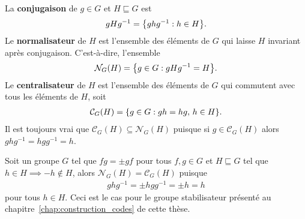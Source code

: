 La \textbf{conjugaison} de $g \in G$ et $H \sqsubseteq G$ est 
\begin{align}
  gHg^{-1} = \qty{ghg^{-1} : h \in H}.
\end{align}
Le \textbf{normalisateur} de $H$ est l'ensemble des éléments de $G$ qui laisse $H$
invariant après conjugaison.
C'est-à-dire, l'ensemble
\begin{align}
  \mathcal{N}_G(H) = \qty{g \in G : gHg^{-1} = H}.
\end{align}
Le \textbf{centralisateur} de $H$ est l'ensemble des éléments de $G$ qui commutent avec
tous les éléments de $H$, soit
\begin{align}
  \mathcal{C}_G(H) = \qty{g \in G : gh = hg,\, h \in H}.
\end{align}
Il est toujours vrai que $\mathcal{C}_G(H) \subseteq \mathcal{N}_G(H)$ puisque
si $g \in \mathcal{C}_G(H)$ alors $ghg^{-1} = hgg^{-1} = h$.

Soit un groupe $G$ tel que $fg = \pm gf$ pour tous $f,g \in G$
et $H \sqsubseteq G$ tel que $h \in H \implies -h \not\in H$,
alors $\mathcal{N}_G(H) = \mathcal{C}_G(H)$ puisque
\begin{align}
  ghg^{-1} = \pm hgg^{-1} = \pm h = h
\end{align}
pour tous $h \in H$.
Ceci est le cas pour le groupe stabilisateur présenté au chapitre~\ref{chap:construction_codes}
de cette thèse.
